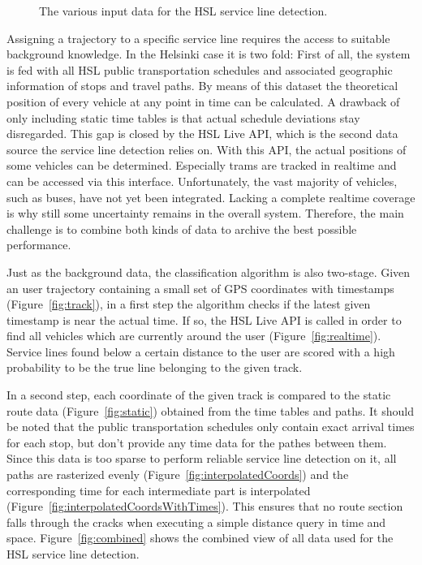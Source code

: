 \documentclass[external]{20120615_deliverable_template_ukob}
\theoremstyle{definition}
\begin{document}
\begin{figure}[ht]
{  \label{fig:interpolatedCoordsWithTimes}
  \setcounter{subfigure}{5}
} 
\caption{
The various input data for the HSL service line detection.
}
\label{fig:SLD}
\end{figure}

Assigning a trajectory to a specific service line requires the access to suitable background knowledge. In the Helsinki case it is two fold:
First of all, the system is fed with all HSL public transportation schedules and associated geographic information of stops and travel paths. By means of this dataset the theoretical position of every vehicle at any point in time can be calculated. A drawback of only including static time tables is that actual schedule deviations stay disregarded. This gap is closed by the HSL Live API, which is the second data source the service line detection relies on. With this API, the actual positions of some vehicles can be determined. Especially trams are tracked in realtime and can be accessed via this interface.  Unfortunately, the vast majority of vehicles, such as buses, have not yet been integrated. Lacking a complete realtime coverage is why still some uncertainty remains in the overall system. Therefore, the main challenge is to combine both kinds of data to archive the best possible performance.

Just as the background data, the classification algorithm is also two-stage. Given an user trajectory containing a small set of GPS coordinates with timestamps (Figure~\ref{fig:track}), in a first step the algorithm checks if the latest given timestamp is near the actual time. If so, the HSL Live API is called in order to find all vehicles which are currently around the user (Figure~\ref{fig:realtime}). Service lines found below a certain distance to the user are scored with a high probability to be the true line belonging to the given track.

In a second step, each coordinate of the given track is compared to the static route data (Figure~\ref{fig:static}) obtained from the time tables and paths.
It should be noted that the public transportation schedules only contain exact arrival times for each stop, but don't provide any time data for the pathes between them. Since this data is too sparse to perform reliable service line detection on it, all paths are rasterized evenly (Figure~\ref{fig:interpolatedCoords}) and the corresponding time for each intermediate part is interpolated (Figure~\ref{fig:interpolatedCoordsWithTimes}). This ensures that no route section falls through the cracks when executing a simple distance query in time and space. Figure~\ref{fig:combined} shows the combined view of all data used for the HSL service line detection.
\end{document}
